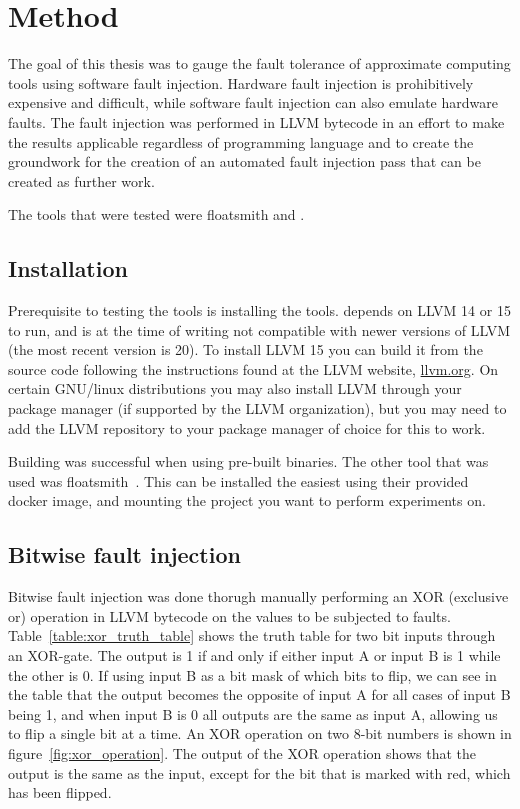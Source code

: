 \section{Method}

The goal of this thesis was to gauge the fault tolerance of approximate computing tools using software fault injection. Hardware fault injection is prohibitively expensive and difficult, while software fault injection can also emulate hardware faults. The fault injection was performed in LLVM bytecode in an effort to make the results applicable regardless of programming language and to create the groundwork for the creation of an automated fault injection pass that can be created as further work.

The tools that were tested were floatsmith and \taffo{}.

\subsection{Installation}
Prerequisite to testing the tools is installing the tools. \taffo{} depends on LLVM 14 or 15 to run, and is at the time of writing not compatible with newer versions of LLVM (the most recent version is 20). To install LLVM 15 you can build it from the source code following the instructions found at the LLVM website, \href{llvm.org}{llvm.org}. On certain GNU/linux distributions you may also install LLVM through your package manager (if supported by the LLVM organization), but you may need to add the LLVM repository  to your package manager of choice for this to work. 

Building \taffo{} was successful when using pre-built binaries. 
The other tool that was used was floatsmith~\citep{floatsmith_paper}. This can be installed the easiest using their provided docker image, and mounting the project you want to perform experiments on.

\subsection{Bitwise fault injection}
Bitwise fault injection was done thorugh manually performing an XOR (exclusive or) operation in LLVM bytecode on the values to be subjected to faults. Table~\ref{table:xor_truth_table} shows the truth table for two bit inputs through an XOR-gate. The output is 1 if and only if either input A or input B is 1 while the other is 0. If using input B as a bit mask of which bits to flip, we can see in the table that the output becomes the opposite of input A for all cases of input B being 1, and when input B is 0 all outputs are the same as input A, allowing us to flip a single bit at a time. An XOR operation on two 8-bit numbers is shown in figure~\ref{fig:xor_operation}. The output of the XOR operation shows that the output is the same as the input, except for the bit that is marked with red, which has been flipped.

